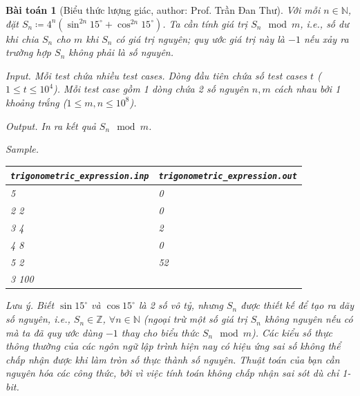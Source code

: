 \documentclass{article}
\newtheorem{baitoan}{Bài toán}
\begin{document}
\begin{baitoan}[Biểu thức lượng giác, author: Prof. {\sc Trần Đan Thư}]
    Với mỗi $n\in\mathbb{N}$, đặt $S_n\coloneqq4^n(\sin^{2n}15^\circ + \cos^{2n}15^\circ)$. Ta cần tính giá trị $S_n\mod m$, i.e., số dư khi chia $S_n$ cho $m$ khi $S_n$ có giá trị nguyên; quy ước giá trị này là $-1$ nếu xảy ra trường hợp $S_n$ không phải là số nguyên.
    \item {\sf Input.}  Mỗi test chứa nhiều test cases. Dòng đầu tiên chứa số test cases $t$ ($1\le t\le10^4$). Mỗi test case gồm 1 dòng chứa 2 số nguyên $n,m$ cách nhau bởi 1 khoảng trắng ($1\le m,n\le10^8$).
    \item {\sf Output.} In ra kết quả $S_n\mod m$.
    \item {\sf Sample.}
    \begin{table}[H]
        \centering
        \begin{tabular}{|l|l|}
            \hline
            \verb|trigonometric_expression.inp| & \verb|trigonometric_expression.out| \\
            \hline
            5 & 0\\
            2 2 & 0\\
            3 4 & 2\\
            4 8 & 0\\
            5 2 & 52\\
            3 100 & \\
            \hline
        \end{tabular}
    \end{table}
    \item {\sf Lưu ý.} Biết $\sin15^\circ$ và $\cos15^\circ$ là 2 số vô tỷ, nhưng $S_n$ được thiết kế để tạo ra dãy số nguyên, i.e., $S_n\in\mathbb{Z}$, $\forall n\in\mathbb{N}$ (ngoại trừ một số giá trị $S_n$ không nguyên nếu có mà ta đã quy ước dùng $-1$ thay cho biểu thức $S_n\mod m$). Các kiểu số thực thông thường của các ngôn ngữ lập trình hiện nay có hiệu ứng sai số không thể chấp nhận được khi làm tròn số thực thành số nguyên. Thuật toán của bạn cần nguyên hóa các công thức, bởi vì việc tính toán không chấp nhận sai sót dù chỉ 1-bit.
\end{baitoan}
\end{document}
